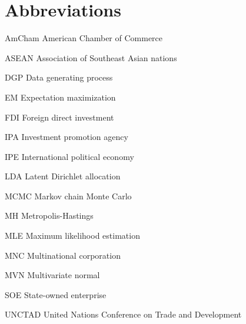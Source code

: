 \abbreviations





\section*{Abbreviations}

\begin{symbollist}
  \item[AmCham] American Chamber of Commerce
  \item[ASEAN] Association of Southeast Asian nations
  \item[DGP] Data generating process
  \item[EM] Expectation maximization
	\item[FDI] Foreign direct investment
  \item[IPA] Investment promotion agency
  \item[IPE] International political economy
  \item[LDA] Latent Dirichlet allocation
	\item[MCMC] Markov chain Monte Carlo
  \item[MH] Metropolis-Hastings
	\item[MLE] Maximum likelihood estimation
  \item[MNC] Multinational corporation
  \item[MVN] Multivariate normal
  \item[SOE] State-owned enterprise
  \item[UNCTAD] United Nations Conference on Trade and Development
\end{symbollist}
